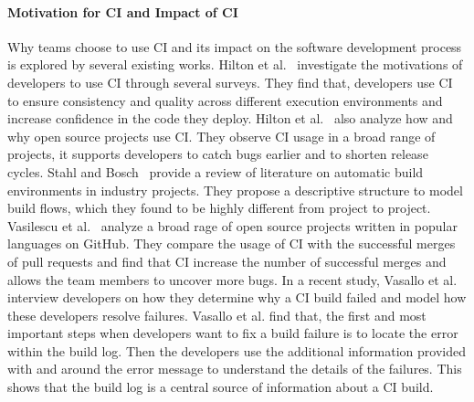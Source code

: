 \documentclass[\myrootdir/main.tex]{subfiles}
\begin{document}
\paragraph{Motivation for CI and Impact of CI}
Why teams choose to use CI and its impact on the software development process is explored by several existing works.
Hilton et al.~\cite{hilton2017trade-offs} investigate the motivations of developers to use CI through several surveys.
They find that, developers use CI to ensure consistency and quality across different execution environments and increase confidence in the code they deploy.
Hilton et al.~\cite{hilton2016usage} also analyze how and why open source projects use CI\@.
They observe CI usage in a broad range of projects, it supports developers to catch bugs earlier and to shorten release cycles.
Stahl and Bosch~\cite{staahl2014modeling} provide a review of literature on automatic build environments in industry projects.
They propose a descriptive structure to model build flows, which they found to be highly different from project to project.
Vasilescu et al.~\cite{vasilescu2015quality} analyze a broad rage of open source projects written in popular languages on GitHub.
They compare the usage of CI with the successful merges of pull requests and find that CI increase the number of successful merges and allows the team members to uncover more bugs.
In a recent study, Vasallo et al.~\cite{vassallo2019every} interview developers on how they determine why a CI build failed and model how these developers resolve failures.
Vasallo et al. find that, the first and most important steps when developers want to fix a build failure is to locate the error within the build log.
Then the developers use the additional information provided with and around the error message to understand the details of the failures.
This shows that the build log is a central source of information about a CI build.
\end{document}
